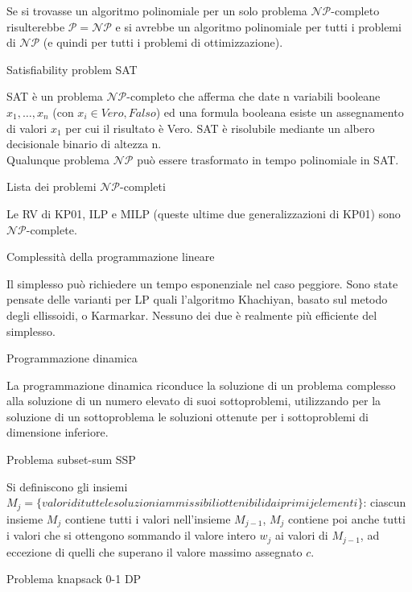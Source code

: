 \documentclass[answers, a4paper, 11pt]{exam}
\begin{document}
\begin{questions}
\begin{solution}
\begin{enumerate}
\end{enumerate}
Se si trovasse un algoritmo polinomiale per un solo problema $\mathcal{NP}$-completo risulterebbe $\mathcal{P} = \mathcal{NP}$ e si avrebbe un algoritmo polinomiale per tutti i problemi di $\mathcal{NP}$ (e quindi per tutti i problemi di ottimizzazione).
\end{solution}
\question Satisfiability problem SAT
\begin{solution}
SAT è un problema $\mathcal{NP}$-completo che afferma che date n variabili booleane $x_{1}, \ldots, x_{n}$ (con $x_{i} \in {Vero, Falso}$) ed una formula booleana esiste un assegnamento di valori $x_{1}$ per cui il risultato è Vero. SAT è risolubile mediante un albero decisionale binario di altezza n.\\
Qualunque problema $\mathcal{NP}$ può essere trasformato in tempo polinomiale in SAT.
\end{solution}
\question Lista dei problemi $\mathcal{NP}$-completi
\begin{solution}
Le RV di KP01, ILP e MILP (queste ultime due generalizzazioni di KP01) sono $\mathcal{NP}$-complete. 
\end{solution}
\question Complessità della programmazione lineare
\begin{solution}
Il simplesso può richiedere un tempo esponenziale nel caso peggiore. Sono state pensate delle varianti per LP quali l'algoritmo Khachiyan, basato sul metodo degli ellissoidi, o Karmarkar. Nessuno dei due è realmente più efficiente del simplesso.
\end{solution}
\question Programmazione dinamica
\begin{solution}
La programmazione dinamica riconduce la soluzione di un problema complesso alla soluzione di un numero elevato di suoi sottoproblemi, utilizzando per la soluzione di un sottoproblema le soluzioni ottenute per i sottoproblemi di dimensione inferiore.
\end{solution}
\question Problema subset-sum SSP
\begin{solution}
 Si definiscono gli insiemi $M_{j} = \{ valori di tutte le soluzioni ammissibili ottenibili dai primi j elementi\}$: ciascun insieme $M_{j}$ contiene tutti i valori nell'insieme $M_{j-1}$, $M_{j}$ contiene poi anche tutti i valori che si ottengono sommando il valore intero $w_{j}$ ai valori di $M_{j-1}$, ad eccezione di quelli che superano il valore massimo assegnato $c$.
\end{solution}
\question Problema knapsack 0-1 DP
\begin{solution}

\end{solution}
\end{questions}
\end{document}
